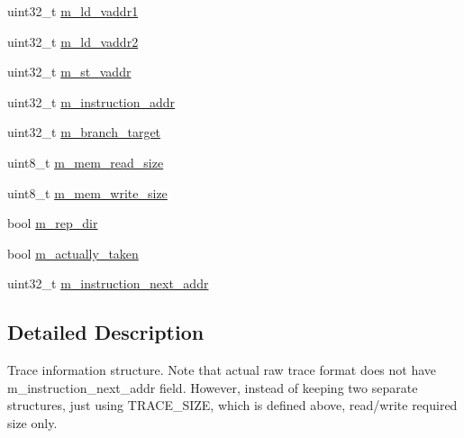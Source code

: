 \begin{DoxyCompactItemize}
uint32\_\-t \hyperlink{structtrace__info__s_a92bca84db2f2475b588ea2537f0e2584}{m\_\-ld\_\-vaddr1}
\item 
uint32\_\-t \hyperlink{structtrace__info__s_a25c287a7d0f2e661da6540dca5361e74}{m\_\-ld\_\-vaddr2}
\item 
uint32\_\-t \hyperlink{structtrace__info__s_aee7bd57efb508304b79e927e0128a356}{m\_\-st\_\-vaddr}
\item 
uint32\_\-t \hyperlink{structtrace__info__s_a9f16025655389f3f53d5185f74feb5fb}{m\_\-instruction\_\-addr}
\item 
uint32\_\-t \hyperlink{structtrace__info__s_a848124e19a975dfbcbbbfc07f8a38382}{m\_\-branch\_\-target}
\item 
uint8\_\-t \hyperlink{structtrace__info__s_a1556d15a3ac7249b4a520c182bc6c028}{m\_\-mem\_\-read\_\-size}
\item 
uint8\_\-t \hyperlink{structtrace__info__s_a4702c91bebc10a9f68a537e46de02909}{m\_\-mem\_\-write\_\-size}
\item 
bool \hyperlink{structtrace__info__s_ae55a52d05ff80215a66e4d1634f7093b}{m\_\-rep\_\-dir}
\item 
bool \hyperlink{structtrace__info__s_a5a5f1935ec0fcdff362542441ce62502}{m\_\-actually\_\-taken}
\item 
uint32\_\-t \hyperlink{structtrace__info__s_a8622989464f39453ee044c599367dfe3}{m\_\-instruction\_\-next\_\-addr}
\end{DoxyCompactItemize}


\subsection{Detailed Description}
Trace information structure. Note that actual raw trace format does not have m\_\-instruction\_\-next\_\-addr field. However, instead of keeping two separate structures, just using TRACE\_\-SIZE, which is defined above, read/write required size only. 

